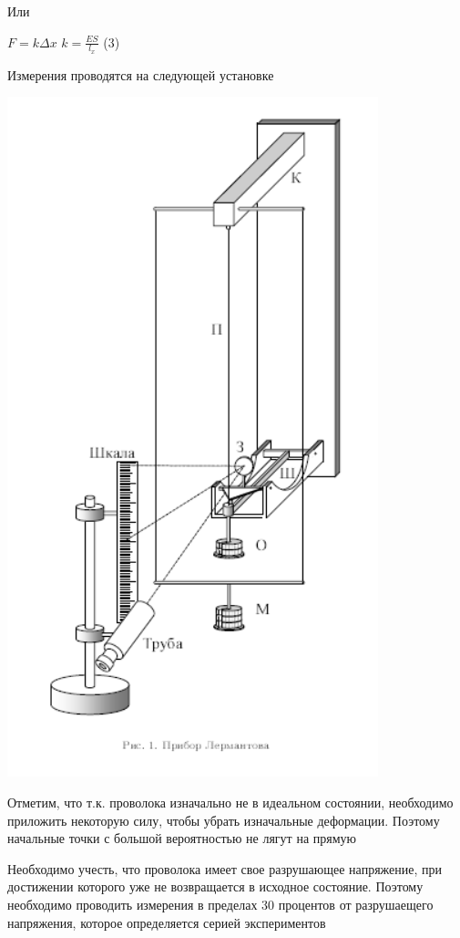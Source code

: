 \documentclass[12pt,a4paper]{article}
\begin{document}
Или
\begin{center}
$F=k\Delta{x}$  \;\;\;\;\;\;\; $k=\frac{ES}{l_{x}}$ (3)
\end{center}
{Измерения проводятся на следующей установке}
\begin{center}
\includegraphics{1.3.1_2} \break
\end{center}
\begin{par}
Отметим, что т.к. проволока изначально не в идеальном состоянии, необходимо приложить некоторую силу, чтобы убрать изначальные деформации. Поэтому начальные точки с большой вероятностью не лягут на прямую
\end{par} 
\begin{par}
Необходимо учесть, что проволока имеет свое разрушающее напряжение, при достижении которого уже не возвращается в исходное состояние. Поэтому необходимо проводить измерения в пределах 30 процентов от разрушаещего напряжения, которое определяется серией экспериментов 
\end{par}
\end{document}
